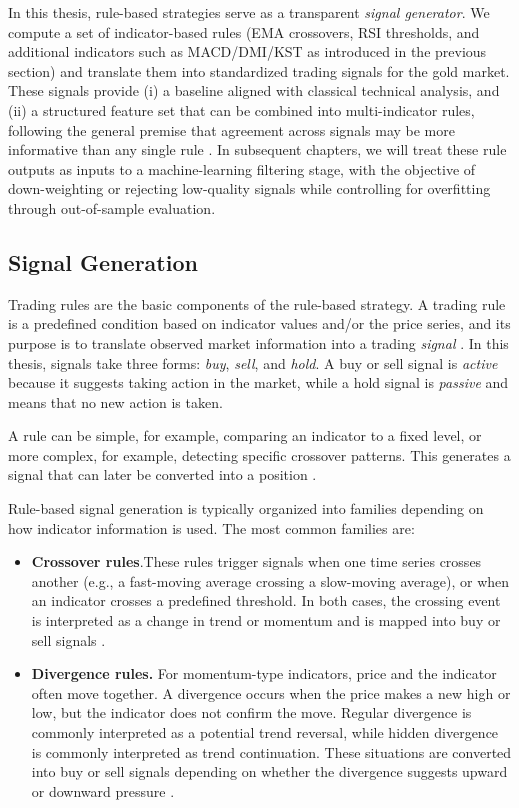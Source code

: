 In this thesis, rule-based strategies serve as a transparent \emph{signal generator}. We compute a set of indicator-based rules (EMA crossovers, RSI thresholds, and additional indicators such as MACD/DMI/KST as introduced in the previous section) and translate them into standardized trading signals for the gold market. These signals provide (i) a baseline aligned with classical technical analysis, and (ii) a structured feature set that can be combined into multi-indicator rules, following the general premise that agreement across signals may be more informative than any single rule \citep{lento2007profitability}. In subsequent chapters, we will treat these rule outputs as inputs to a machine-learning filtering stage, with the objective of down-weighting or rejecting low-quality signals while controlling for overfitting through out-of-sample evaluation.


\subsection{Signal Generation}

Trading rules are the basic components of the rule-based strategy. A trading rule is a predefined condition based on indicator values and/or the price series, and its purpose is to translate observed market information into a trading \emph{signal} \citep{ozturk2016heuristic}. In this thesis, signals take three forms: \emph{buy}, \emph{sell}, and \emph{hold}. A buy or sell signal is \emph{active} because it suggests taking action in the market, while a hold signal is \emph{passive} and means that no new action is taken.

A rule can be simple, for example, comparing an indicator to a fixed level, or more complex, for example, detecting specific crossover patterns. This generates a signal that can later be converted into a position \citep{ozturk2016heuristic}.

Rule-based signal generation is typically organized into families depending on how indicator information is used. The most common families are:

\begin{itemize}
    \item \textbf{Crossover rules}.These rules trigger signals when one time series crosses another (e.g., a fast-moving average crossing a slow-moving average), or when an indicator crosses a predefined threshold. In both cases, the crossing event is interpreted as a change in trend or momentum and is mapped into buy or sell signals \citep{ozturk2016heuristic}.
    \item \textbf{Divergence rules.} For momentum-type indicators, price and the indicator often move together. A divergence occurs when the price makes a new high or low, but the indicator does not confirm the move. Regular divergence is commonly interpreted as a potential trend reversal, while hidden divergence is commonly interpreted as trend continuation. These situations are converted into buy or sell signals depending on whether the divergence suggests upward or downward pressure \citep{ozturk2016heuristic}.
\end{itemize}

